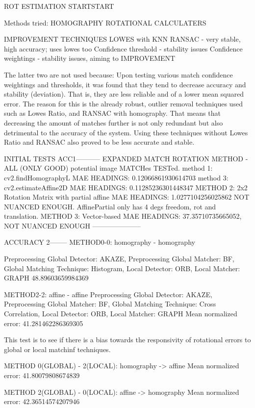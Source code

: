 ROT ESTIMATION STARTSTART

Methods tried:
HOMOGRAPHY ROTATIONAL CALCULATERS




IMPROVEMENT TECHNIQUES
LOWES with KNN
RANSAC - very stable, high accuracy; uses lowes too
Confidence threshold - stability issues
Confidence weightings - stability issues, aiming to IMPROVEMENT

The latter two are not used because:
Upon testing various match confidence weightings and thresholds, it was found that they tend to decrease accuracy and stability (deviation). That is, they are less reliable and of a lower mean squared error. The reason for this is the already robust, outlier removal techniques used such as Lowes Ratio, and RANSAC with homography. That means that decreasing the amount of matches further is not only redundant but also detrimental to the accuracy of the system. Using these techniques without Lowes Ratio and RANSAC also proved to be less accurate and stable.


INITIAL TESTS ACC1-----------
EXPANDED MATCH ROTATION METHOD - ALL (ONLY GOOD) potential image MATCHes TESTed. 
method 1: cv2.findHomographyL MAE HEADINGS: 0.12066861930614703
method 3: cv2.estimateAffine2D MAE HEADINGS: 0.11285236301448347 
METHOD 2: 2x2 Rotation Matrix with partial affine MAE HEADINGS: 1.0277104256025862 NOT NUANCED ENOUGH. AffinePartial only has 4 degs freedom, rot and translation. 
METHOD 3: Vector-based MAE HEADINGS: 37.35710735665052, NOT NUANCED ENOUGH
---------------------


ACCURACY 2--------
METHOD0-0: homography - homography

Preprocessing Global Detector: AKAZE, Preprocessing Global Matcher: BF, Global Matching Technique: Histogram, Local Detector: ORB, Local Matcher: GRAPH
48.89603659984369

METHOD2-2: affine  - affine
Preprocessing Global Detector: AKAZE, Preprocessing Global Matcher: BF, Global Matching Technique: Cross Correlation, Local Detector: ORB, Local Matcher: GRAPH
Mean normalized error: 41.281462286369305


This test is to see if there is a bias towards the responsivity of rotational errors to global or local matchinf techniques.

METHOD 0(GLOBAL) - 2(LOCAL): homography -> affine
Mean normalized error: 41.80079808674839



METHOD 2(GLOBAL) - 0(LOCAL): affine -> homography   
Mean normalized error: 42.36514574207946



